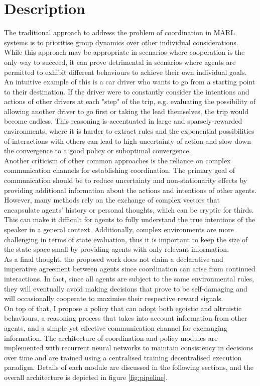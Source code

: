 \documentclass[a4paper,singleside,12pt]{report} %
\begin{document}
\section{Description}\label{description}
The traditional approach to address the problem of coordination in MARL systems is to prioritise group dynamics over other individual considerations. While this approach may be appropriate in scenarios where cooperation is the only way to succeed, it can prove detrimental in scenarios where agents are permitted to exhibit different behaviours to achieve their own individual goals.\\
An intuitive example of this is a car driver who wants to go from a starting point to their destination. If the driver were to constantly consider the intentions and actions of other drivers at each "step" of the trip, e.g. evaluating the possibility of allowing another driver to go first or taking the lead themselves, the trip would become endless. This reasoning is accentuated in large and sparsely-rewarded environments, where it is harder to extract rules and the exponential possibilities of interactions with others can lead to high uncertainty of action and slow down the convergence to a good policy or suboptimal convergence.\\
Another criticism of other common approaches is the reliance on complex communication channels for establishing coordination. The primary goal of communication should be to reduce uncertainty and non-stationarity effects by providing additional information about the actions and intentions of other agents. However, many methods rely on the exchange of complex vectors that encapsulate agents' history or personal thoughts, which can be cryptic for thirds. This can make it difficult for agents to fully understand the true intentions of the speaker in a general context. Additionally, complex environments are more challenging in terms of state evaluation, thus it is important to keep the size of the state space small by providing agents with only relevant information.\\
As a final thought, the proposed work does not claim a declarative and imperative agreement between agents since coordination can arise from continued interactions. In fact, since all agents are subject to the same environmental rules, they will eventually avoid making decisions that prove to be self-damaging and will occasionally cooperate to maximise their respective reward signals.\\
On top of that, I propose a policy that can adopt both egoistic and altruistic behaviours, a reasoning process that takes into account information from other agents, and a simple yet effective communication channel for exchanging information. The architecture of coordination and policy modules are implemented with recurrent neural networks to maintain consistency in decisions over time and are trained using a centralised training decentralised execution paradigm. Details of each module are discussed in the following sections, and the overall architecture is depicted in figure \ref{fig:pipeline}.
\end{document}
